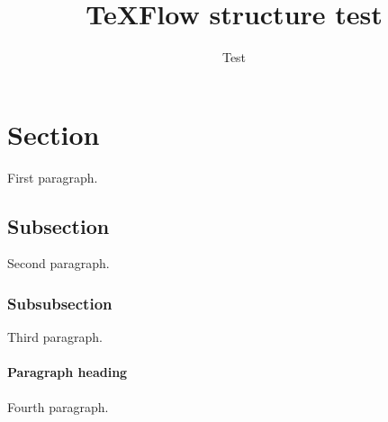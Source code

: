 \documentclass[11pt,a4paper]{article}
\title{TeXFlow structure test}
\author{Test}
\begin{document}
\maketitle
\section{Section}
First paragraph.
\subsection{Subsection}
Second paragraph.
\subsubsection{Subsubsection}
Third paragraph.
\paragraph{Paragraph heading} Fourth paragraph.
\end{document}

